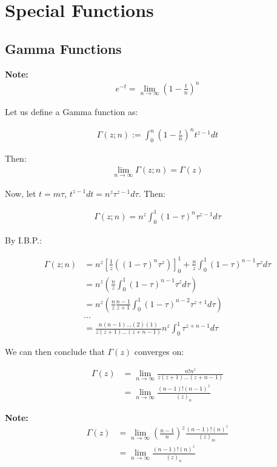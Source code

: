 \documentclass{article}
\theoremstyle{definition}
\begin{document}
\section{Special Functions}
\subsection{Gamma Functions}
\textbf{Note:}
\begin{align*}
e^{-t} = \lim_{n\to\infty}(1-\frac{t}{n})^n
\end{align*}

Let us define a Gamma function as:

\begin{align*}
\Gamma(z;n) := \int_{0}^{n} (1-\frac{t}{n})^n t^{z-1} dt  
\end{align*}

Then:
\begin{align*}
\lim_{n\to\infty} \Gamma(z;n) = \Gamma(z)
\end{align*}

Now, let $t = m \tau$, $t^{z-1}dt = n^z \tau^{z-1} d\tau$. Then:

\begin{align*}
\Gamma(z;n) = n^z \int_{0}^{1} (1-\tau)^n \tau^{z-1} d\tau
\end{align*}

By I.B.P.:


\begin{align*}
\Gamma(z;n) &= n^z \left[ \frac{1}{z} \left((1-\tau)^n \tau^{z}\right)\right]_0^1 + \frac{n}{z}\int_{0}^{1} (1-\tau)^{n-1} \tau^{z} d\tau \\ 
&= n^z \left(\frac{n}{z}\int_{0}^{1} (1-\tau)^{n-1} \tau^{z} d\tau\right) \\
&= n^z \left(\frac{n}{z} \frac{n-1}{z+1}\int_{0}^{1} (1-\tau)^{n-2} \tau^{z+1} d\tau\right) \\
&...\\
&= \frac{n(n-1)...(2)(1)}{z(z+1)...(z+n-1)} n^z \int_{0}^{1} \tau^{z+n-1} d\tau 
\end{align*}

We can then conclude that $\Gamma(z)$ converges on:

\begin{align}\label{eq:gamman}
\Gamma(z) &= \lim_{n\to\infty} \frac{n! n^z}{z(z+1)...(z+n-1)} \\ 
 &= \lim_{n\to\infty} \frac{(n-1)! (n-1)^z}{(z)_n} 
\end{align}

\textbf{Note:}
\begin{align*}
\Gamma(z) &= \lim_{n\to\infty} \left(\frac{n-1}{n} \right)^z   \frac{(n-1)! (n)^z}{(z)_m} \\
&= \lim_{n\to\infty}  \frac{(n-1)! (n)^z}{(z)_n} 
\end{align*}
\end{document}
